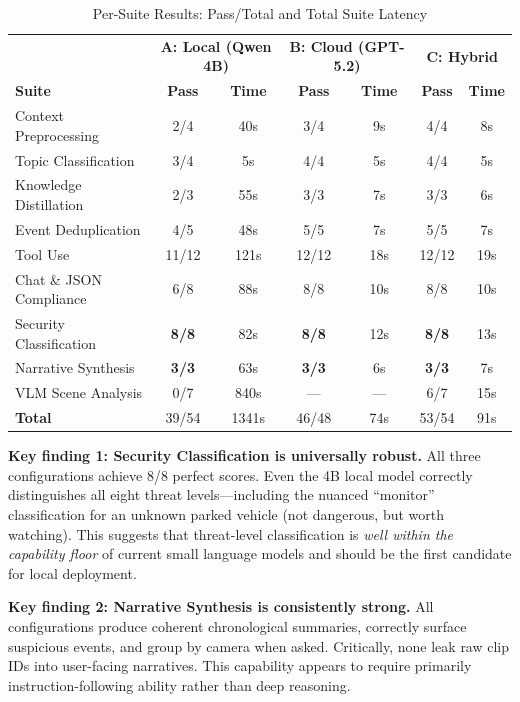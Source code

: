 \documentclass[conference]{IEEEtran}
\begin{document}
\begin{table}[t]
\centering
\caption{Per-Suite Results: Pass/Total and Total Suite Latency}
\label{tab:suite}
\begin{tabular}{lcc|cc|cc}
\toprule
& \multicolumn{2}{c|}{\textbf{A: Local (Qwen 4B)}} & \multicolumn{2}{c|}{\textbf{B: Cloud (GPT-5.2)}} & \multicolumn{2}{c}{\textbf{C: Hybrid}} \\
\textbf{Suite} & \textbf{Pass} & \textbf{Time} & \textbf{Pass} & \textbf{Time} & \textbf{Pass} & \textbf{Time} \\
\midrule
Context Preprocessing & 2/4 & 40s & 3/4 & 9s & 4/4 & 8s \\
Topic Classification & 3/4 & 5s & 4/4 & 5s & 4/4 & 5s \\
Knowledge Distillation & 2/3 & 55s & 3/3 & 7s & 3/3 & 6s \\
Event Deduplication & 4/5 & 48s & 5/5 & 7s & 5/5 & 7s \\
Tool Use & 11/12 & 121s & 12/12 & 18s & 12/12 & 19s \\
Chat \& JSON Compliance & 6/8 & 88s & 8/8 & 10s & 8/8 & 10s \\
Security Classification & \textbf{8/8} & 82s & \textbf{8/8} & 12s & \textbf{8/8} & 13s \\
Narrative Synthesis & \textbf{3/3} & 63s & \textbf{3/3} & 6s & \textbf{3/3} & 7s \\
VLM Scene Analysis & 0/7 & 840s & --- & --- & 6/7 & 15s \\
\midrule
\textbf{Total} & 39/54 & 1341s & 46/48 & 74s & 53/54 & 91s \\
\bottomrule
\end{tabular}
\end{table}

\textbf{Key finding 1: Security Classification is universally robust.}
All three configurations achieve 8/8 perfect scores. Even the 4B local
model correctly distinguishes all eight threat levels---including the
nuanced ``monitor'' classification for an unknown parked vehicle (not
dangerous, but worth watching). This suggests that threat-level
classification is \emph{well within the capability floor} of current
small language models and should be the first candidate for local
deployment.

\textbf{Key finding 2: Narrative Synthesis is consistently strong.}
All configurations produce coherent chronological summaries, correctly
surface suspicious events, and group by camera when asked. Critically,
none leak raw clip IDs into user-facing narratives. This capability
appears to require primarily instruction-following ability rather than
deep reasoning.
\end{document}
